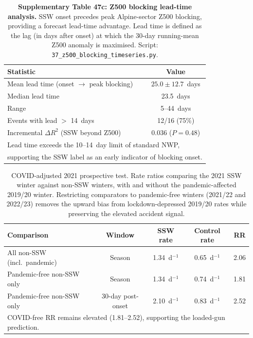 \documentclass[11pt,letterpaper]{article}
\begin{document}
\begin{table}[!ht]
\centering
\caption{\textbf{Supplementary Table 47c: Z500 blocking lead-time analysis.} SSW onset precedes peak Alpine-sector Z500 blocking, providing a forecast lead-time advantage. Lead time is defined as the lag (in days after onset) at which the 30-day running-mean Z500 anomaly is maximised. Script: \texttt{37\_z500\_blocking\_timeseries.py}.}
\label{tab:blocking_lead}
\small
\begin{tabular}{lc}
\toprule
Statistic & Value \\
\midrule
Mean lead time (onset $\to$ peak blocking) & $25.0 \pm 12.7$~days \\
Median lead time & 23.5~days \\
Range & 5--44~days \\
Events with lead $>$ 14~days & 12/16 (75\%) \\
\midrule
Incremental $\Delta R^2$ (SSW beyond Z500) & 0.036 ($P = 0.48$) \\
\bottomrule
\multicolumn{2}{l}{\footnotesize Lead time exceeds the 10--14~day limit of standard NWP,} \\
\multicolumn{2}{l}{\footnotesize supporting the SSW label as an early indicator of blocking onset.} \\
\end{tabular}
\end{table}

\begin{table}[htbp]
\caption{COVID-adjusted 2021 prospective test. Rate ratios comparing the 2021 SSW winter against non-SSW winters, with and without the pandemic-affected 2019/20 winter. Restricting comparators to pandemic-free winters (2021/22 and 2022/23) removes the upward bias from lockdown-depressed 2019/20 rates while preserving the elevated accident signal.}
\label{tab:covid_adjusted}
\small
\begin{tabular}{lcccc}
\toprule
Comparison & Window & SSW rate & Control rate & RR \\
\midrule
All non-SSW (incl.\ pandemic) & Season & 1.34~d$^{-1}$ & 0.65~d$^{-1}$ & 2.06 \\
Pandemic-free non-SSW only & Season & 1.34~d$^{-1}$ & 0.74~d$^{-1}$ & 1.81 \\
Pandemic-free non-SSW only & 30-day post-onset & 2.10~d$^{-1}$ & 0.83~d$^{-1}$ & 2.52 \\
\bottomrule
\multicolumn{5}{l}{\footnotesize COVID-free RR remains elevated (1.81--2.52), supporting the loaded-gun prediction.} \\
\end{tabular}
\end{table}
\end{document}
